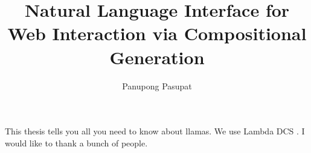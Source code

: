 \documentclass{report}
\begin{document}
\title{Natural Language Interface for Web Interaction via Compositional Generation}
\author{Panupong Pasupat}
 
\beforepreface
{}
This thesis tells you all you need to know about llamas.
We use Lambda DCS \cite{liang2013lambdadcs}.
I would like to thank a bunch of people.
\afterpreface



\appendix



\end{document}
